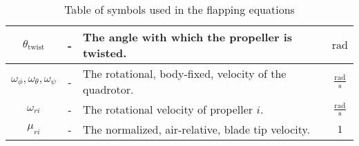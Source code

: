 \begin{table}
\begin{tabularx}{\tablewidth}{|c|c|X|c|}
            $\theta_{\text{twist}}$ & - & The angle with which the propeller is twisted.  & $\text{rad}$ \\\hline
            $\omega_{\phi},\omega_{\theta},\omega_{\psi}$ & - & The rotational, body-fixed, velocity of the quadrotor. & $\frac{\text{rad}}{\text{s}}$ \\\hline
            $\omega_{ri}$ & - & The rotational velocity of propeller $i$. & $\frac{\text{rad}}{\text{s}}$ \\\hline
            $\mu_{ri}$ & - & The normalized, air-relative, blade tip velocity. & $1$ \\\hline
        \end{tabularx}
        \label{tbl:observer:flapping:symbols}
        \caption{Table of symbols used in the flapping equations}
    \end{table}
